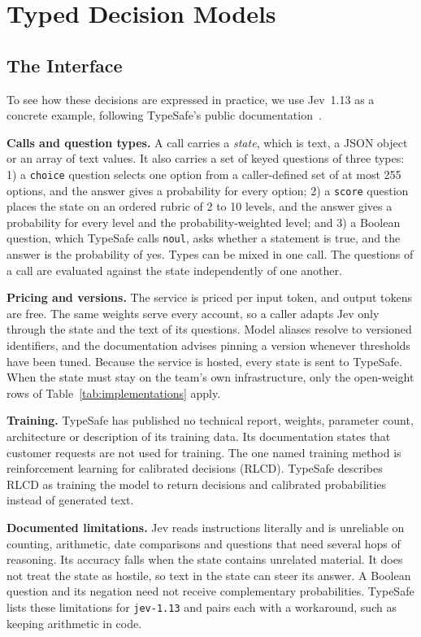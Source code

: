 \section{Typed Decision Models}
\label{sec:models}

\subsection{The Interface}
\label{sec:jev}

To see how these decisions are expressed in practice, we use Jev~1.13 as a concrete example, following TypeSafe's public documentation~\cite{typesafe2026docs}.

\noindent\textbf{Calls and question types.} A call carries a \emph{state}, which is text, a JSON object or an array of text values. It also carries a set of keyed questions of three types: 1) a \texttt{choice} question selects one option from a caller-defined set of at most 255 options, and the answer gives a probability for every option; 2) a \texttt{score} question places the state on an ordered rubric of 2 to 10 levels, and the answer gives a probability for every level and the probability-weighted level; and 3) a Boolean question, which TypeSafe calls \texttt{noul}, asks whether a statement is true, and the answer is the probability of yes. Types can be mixed in one call. The questions of a call are evaluated against the state independently of one another.

\noindent\textbf{Pricing and versions.} The service is priced per input token, and output tokens are free. The same weights serve every account, so a caller adapts Jev only through the state and the text of its questions. Model aliases resolve to versioned identifiers, and the documentation advises pinning a version whenever thresholds have been tuned. Because the service is hosted, every state is sent to TypeSafe. When the state must stay on the team's own infrastructure, only the open-weight rows of Table~\ref{tab:implementations} apply.

\noindent\textbf{Training.} TypeSafe has published no technical report, weights, parameter count, architecture or description of its training data. Its documentation states that customer requests are not used for training. The one named training method is reinforcement learning for calibrated decisions (RLCD). TypeSafe describes RLCD as training the model to return decisions and calibrated probabilities instead of generated text.

\noindent\textbf{Documented limitations.} Jev reads instructions literally and is unreliable on counting, arithmetic, date comparisons and questions that need several hops of reasoning. Its accuracy falls when the state contains unrelated material. It does not treat the state as hostile, so text in the state can steer its answer. A Boolean question and its negation need not receive complementary probabilities. TypeSafe lists these limitations for \texttt{jev-1.13} and pairs each with a workaround, such as keeping arithmetic in code.

